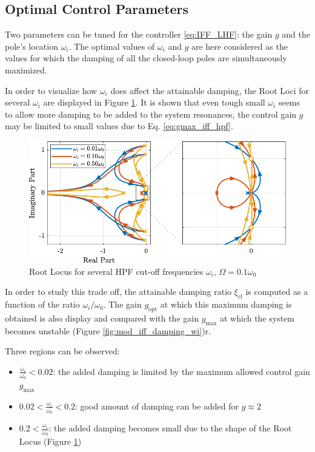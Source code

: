 \documentclass{ISMA_USD2020}
\begin{document}
\subsection{Optimal Control Parameters}
\label{sec:org122256a}
Two parameters can be tuned for the controller \eqref{eq:IFF_LHF}: the gain \(g\) and the pole's location \(\omega_i\).
The optimal values of \(\omega_i\) and \(g\) are here considered as the values for which the damping of all the closed-loop poles are simultaneously maximized.

In order to visualize how \(\omega_i\) does affect the attainable damping, the Root Loci for several \(\omega_i\) are displayed in Figure \ref{fig:root_locus_wi_modified_iff}.
It is shown that even tough small \(\omega_i\) seems to allow more damping to be added to the system resonances, the control gain \(g\) may be limited to small values due to Eq. \eqref{eq:gmax_iff_hpf}.

\begin{figure}[htbp]
\centering
\includegraphics[scale=1]{figs/root_locus_wi_modified_iff.pdf}
\caption{\label{fig:root_locus_wi_modified_iff}Root Locus for several HPF cut-off frequencies \(\omega_i\), \(\Omega = 0.1 \omega_0\)}
\end{figure}

In order to study this trade off, the attainable damping ratio \(\xi_{\text{cl}}\) is computed as a function of the ratio \(\omega_i/\omega_0\).
The gain \(g_{\text{opt}}\) at which this maximum damping is obtained is also display and compared with the gain \(g_{\text{max}}\) at which the system becomes unstable (Figure \ref{fig:mod_iff_damping_wi})r.

Three regions can be observed:
\begin{itemize}
\item \(\frac{\omega_i}{\omega_0} < 0.02\): the added damping is limited by the maximum allowed control gain \(g_{\text{max}}\)
\item \(0.02 < \frac{\omega_i}{\omega_0} < 0.2\): good amount of damping can be added for \(g \approx 2\)
\item \(0.2 < \frac{\omega_i}{\omega_0}\): the added damping becomes small due to the shape of the Root Locus (Figure \ref{fig:root_locus_wi_modified_iff})
\end{itemize}
\end{document}
